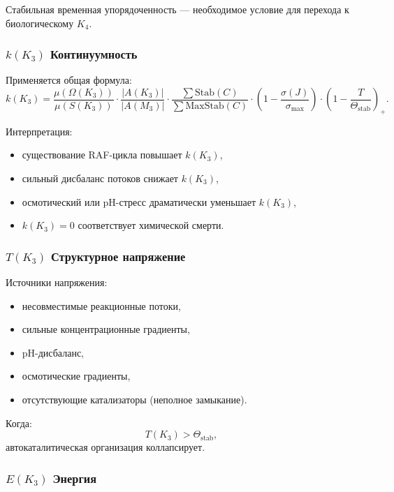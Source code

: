 Стабильная временная упорядоченность — необходимое условие для перехода
к биологическому $K_4$.

\subsubsection{\texorpdfstring{$k(K_3)$}{k(K_3)} Континуумность}

Применяется общая формула:
\[
k(K_3) =
\frac{\mu(\Omega(K_3))}{\mu(S(K_3))}
\cdot
\frac{|A(K_3)|}{|A(M_3)|}
\cdot
\frac{\sum \mathrm{Stab}(C)}{\sum \mathrm{MaxStab}(C)}
\cdot
(1 - \frac{\sigma(J)}{\sigma_{\max}})
\cdot
(1 - \frac{T}{\Theta_{\mathrm{stab}}})_+.
\]

Интерпретация:
\begin{itemize}
    \item существование RAF-цикла повышает $k(K_3)$,
    \item сильный дисбаланс потоков снижает $k(K_3)$,
    \item осмотический или pH-стресс драматически уменьшает $k(K_3)$,
    \item $k(K_3)=0$ соответствует химической смерти.
\end{itemize}

\subsubsection{\texorpdfstring{$T(K_3)$}{T(K_3)} Структурное напряжение}

Источники напряжения:
\begin{itemize}
    \item несовместимые реакционные потоки,
    \item сильные концентрационные градиенты,
    \item pH-дисбаланс,
    \item осмотические градиенты,
    \item отсутствующие катализаторы (неполное замыкание).
\end{itemize}

Когда:
\[
T(K_3) > \Theta_{\mathrm{stab}},
\]
автокаталитическая организация коллапсирует.

\subsubsection{\texorpdfstring{$E(K_3)$}{E(K_3)} Энергия}

